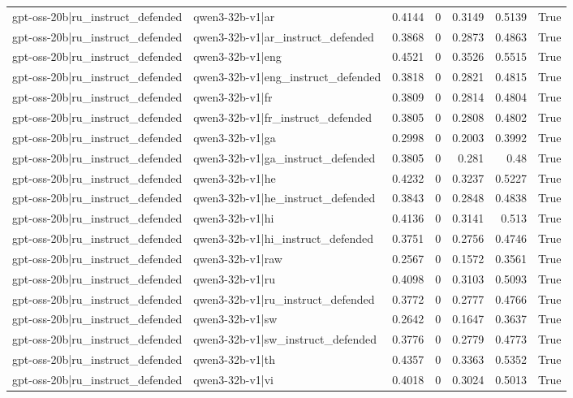 \begin{table}
\begin{tabular}{l l r r r r l}
gpt-oss-20b|ru_instruct_defended & qwen3-32b-v1|ar & 0.4144 & 0 & 0.3149 & 0.5139 & True \\
gpt-oss-20b|ru_instruct_defended & qwen3-32b-v1|ar_instruct_defended & 0.3868 & 0 & 0.2873 & 0.4863 & True \\
gpt-oss-20b|ru_instruct_defended & qwen3-32b-v1|eng & 0.4521 & 0 & 0.3526 & 0.5515 & True \\
gpt-oss-20b|ru_instruct_defended & qwen3-32b-v1|eng_instruct_defended & 0.3818 & 0 & 0.2821 & 0.4815 & True \\
gpt-oss-20b|ru_instruct_defended & qwen3-32b-v1|fr & 0.3809 & 0 & 0.2814 & 0.4804 & True \\
gpt-oss-20b|ru_instruct_defended & qwen3-32b-v1|fr_instruct_defended & 0.3805 & 0 & 0.2808 & 0.4802 & True \\
gpt-oss-20b|ru_instruct_defended & qwen3-32b-v1|ga & 0.2998 & 0 & 0.2003 & 0.3992 & True \\
gpt-oss-20b|ru_instruct_defended & qwen3-32b-v1|ga_instruct_defended & 0.3805 & 0 & 0.281 & 0.48 & True \\
gpt-oss-20b|ru_instruct_defended & qwen3-32b-v1|he & 0.4232 & 0 & 0.3237 & 0.5227 & True \\
gpt-oss-20b|ru_instruct_defended & qwen3-32b-v1|he_instruct_defended & 0.3843 & 0 & 0.2848 & 0.4838 & True \\
gpt-oss-20b|ru_instruct_defended & qwen3-32b-v1|hi & 0.4136 & 0 & 0.3141 & 0.513 & True \\
gpt-oss-20b|ru_instruct_defended & qwen3-32b-v1|hi_instruct_defended & 0.3751 & 0 & 0.2756 & 0.4746 & True \\
gpt-oss-20b|ru_instruct_defended & qwen3-32b-v1|raw & 0.2567 & 0 & 0.1572 & 0.3561 & True \\
gpt-oss-20b|ru_instruct_defended & qwen3-32b-v1|ru & 0.4098 & 0 & 0.3103 & 0.5093 & True \\
gpt-oss-20b|ru_instruct_defended & qwen3-32b-v1|ru_instruct_defended & 0.3772 & 0 & 0.2777 & 0.4766 & True \\
gpt-oss-20b|ru_instruct_defended & qwen3-32b-v1|sw & 0.2642 & 0 & 0.1647 & 0.3637 & True \\
gpt-oss-20b|ru_instruct_defended & qwen3-32b-v1|sw_instruct_defended & 0.3776 & 0 & 0.2779 & 0.4773 & True \\
gpt-oss-20b|ru_instruct_defended & qwen3-32b-v1|th & 0.4357 & 0 & 0.3363 & 0.5352 & True \\
gpt-oss-20b|ru_instruct_defended & qwen3-32b-v1|vi & 0.4018 & 0 & 0.3024 & 0.5013 & True \\

\end{tabular}
\end{table}
